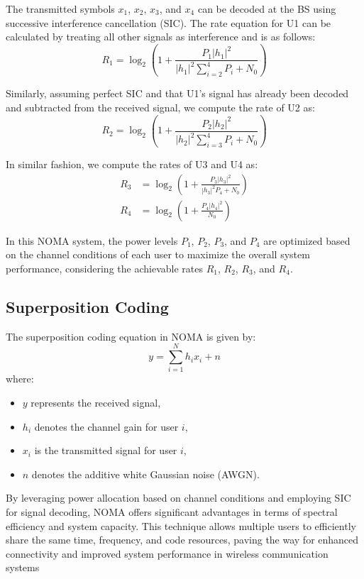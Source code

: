 \documentclass[conference]{IEEEtran}
\begin{document}
The transmitted symbols $x_1$, $x_2$, $x_3$, and $x_4$ can be decoded at the BS using successive interference cancellation (SIC). The rate equation for U1 can be calculated by treating all other signals as interference and is as follows:
\begin{equation*}
R_1 = \log_2\left(1 + \frac{P_1|h_1|^2}{|h_1|^2\sum_{i=2}^{4} P_i + N_0}\right)
\end{equation*}

Similarly, assuming perfect SIC and that U1's signal has already been decoded and subtracted from the received signal, we compute the rate of U2 as:
\begin{equation*}
R_2 = \log_2\left(1 + \frac{P_2|h_2|^2}{|h_2|^2\sum_{i=3}^{4} P_i + N_0}\right)
\end{equation*}

In similar fashion, we compute the rates of U3 and U4 as:
\begin{align*}
R_3 &= \log_2\left(1 + \frac{P_3|h_3|^2}{|h_3|^2 P_4 + N_0}\right) \\
R_4 &= \log_2\left(1 + \frac{P_4|h_4|^2}{N_0}\right)
\end{align*}

In this NOMA system, the power levels $P_1$, $P_2$, $P_3$, and $P_4$ are optimized based on the channel conditions of each user to maximize the overall system performance, considering the achievable rates $R_1$, $R_2$, $R_3$, and $R_4$.

\subsection{Superposition Coding}
The superposition coding equation in NOMA is given by:
$$
y = \sum_{i=1}^{N} h_i x_i + n
$$
where:
\begin{itemize}
  \item $y$ represents the received signal,
  \item $h_i$ denotes the channel gain for user $i$,
  \item $x_i$ is the transmitted signal for user $i$,
  \item $n$ denotes the additive white Gaussian noise (AWGN).
\end{itemize}

By leveraging power allocation based on channel conditions and employing SIC for signal decoding, NOMA offers significant advantages in terms of spectral efficiency and system capacity. This technique allows multiple users to efficiently share the same time, frequency, and code resources, paving the way for enhanced connectivity and improved system performance in wireless communication systems
\end{document}
